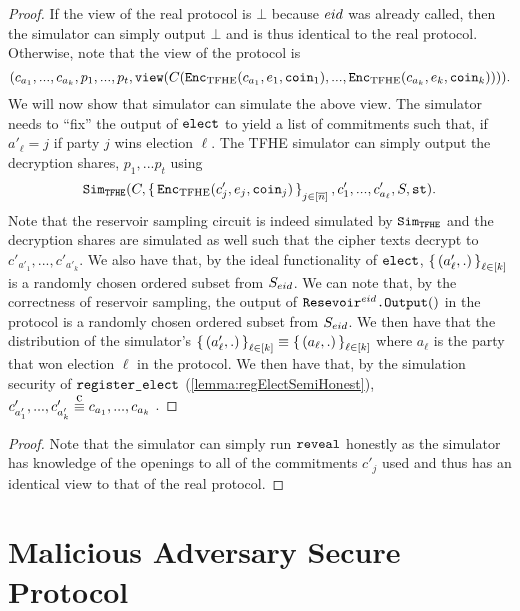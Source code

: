 \begin{lemma}
	\begin{proof}
		If the view of the real protocol is $\bot$ because ${eid}$ was already called, then the simulator can simply output $\bot$
		and is thus identical to the real protocol.
		Otherwise, note that the view of the protocol is
		$$
			(c_{a_1}, ..., c_{a_k}, p_1, ..., p_t, \texttt{view}(C(\texttt{Enc}_{\mathrm{TFHE}}(c_{a_1}, e_1, \texttt{coin}_1), ..., \texttt{Enc}_{\mathrm{TFHE}}(c_{a_k}, e_k, \texttt{coin}_k) ))).
		$$
		We will now show that simulator can simulate the above view.	
		The simulator needs to ``fix'' the output of $\texttt{elect}$ to yield
		a list of commitments such that, if $a'_\ell = j$ if party $j$ wins election $\ell$.
		The TFHE simulator can simply output the decryption shares, $p_1, ... p_t$ using 
		$$\texttt{Sim}_{{\texttt{TFHE}}}(C, \set{\texttt{Enc}_{\mathrm{TFHE}}(c'_j, e_j, \texttt{coin}_j)}_{j \in [\overline{n}]}, c'_1, ..., c'_{a_\ell}, S, \texttt{st}).$$
		Note that the reservoir sampling circuit is indeed simulated by $\texttt{Sim}_{{\texttt{TFHE}}}$
		and the decryption shares are simulated as well such that the cipher texts decrypt
		to $c'_{a'_1}, ..., c'_{a'_k}$.
		We also have that, by the ideal functionality of $\texttt{elect}$, $\set{(a'_\ell, .)}_{\ell \in [k]}$ is a randomly chosen
		ordered subset from $S_{eid}$. We can note that, by the correctness of reservoir sampling,
		the output of $\texttt{Resevoir}^{{eid}}\texttt{.Output}()$ in the protocol is a randomly chosen ordered subset from $S_{eid}$.
		We then have that the distribution of the simulator's $\set{(a'_\ell, .)}_{\ell \in [k]} \equiv \set{(a_\ell, .)}_{\ell \in [k]}$
		where $a_\ell$ is the party that won election $\ell$ in the protocol.
		We then have that, by the simulation security of $\texttt{register\_elect}$ (\cref{lemma:regElectSemiHonest}), $c'_{a'_1}, ..., c'_{a'_k} \compInd c_{a_1}, ..., c_{a_k}$ .
	\end{proof}
\end{lemma}

\begin{lemma}
	\begin{proof}
		Note that the simulator can simply run $\texttt{reveal}$ honestly as the simulator has knowledge of the openings to all of the commitments $c'_j$ used
		and thus has an identical view to that of the real protocol.
	\end{proof}
\end{lemma}

\section{Malicious Adversary Secure Protocol}
\newcommand{\inCTList}{\texttt{Inps}}
\newcommand{\decryptShares}{\texttt{Shares}}

